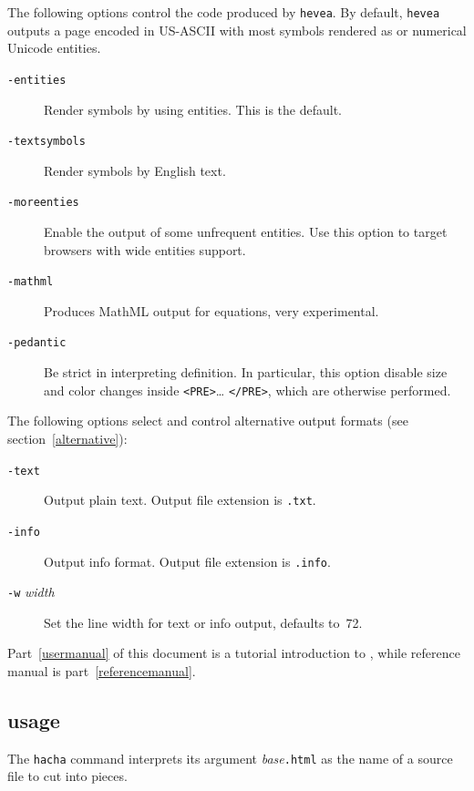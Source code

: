 The following options control the {\html} code produced by
\texttt{hevea}. By default, \texttt{hevea} outputs a page encoded in
US-ASCII with most symbols rendered as {\html} or numerical Unicode
entities.
\begin{description}
\item[{\tt -entities}] Render symbols by using entities. This is the default.
\item[{\tt -textsymbols}] Render symbols by English text.
\item[{\tt -moreenties}] Enable the output of some unfrequent entities. Use
this option to target browsers with wide entities support.
\item[{\tt -mathml}] Produces MathML output for equations, very
experimental.
\item[{\tt -pedantic}]  Be strict in interpreting \html{}
definition. In particular, this option disable size and color changes inside
\verb+<PRE>+\ldots{} \verb+</PRE>+, which are otherwise performed.
\end{description}

The following options select and control alternative output formats
(see section~\ref{alternative}):
\begin{description}
\item[{\tt -text}] Output plain text. Output file
extension is \texttt{.txt}.
\item[{\tt -info}] Output info format. Output file extension
is \texttt{.info}.
\item[{\tt -w} {\it width}] Set the line width for text or info
output, defaults to~72.
\end{description}

Part~\ref{usermanual} of this document is
a tutorial introduction to \hevea{},
while \hevea{} reference manual is part~\ref{referencemanual}.


\subsection{\hacha{} usage}
The \texttt{hacha} command interprets its argument
\textit{base}\texttt{.html} as the name of
a \html{} source file to cut into pieces.

